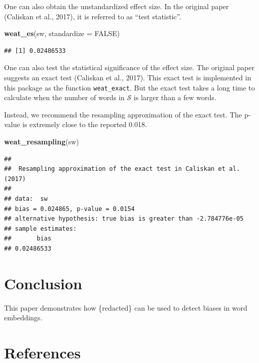 \documentclass[english,man,mask]{apa6}
\newenvironment{Shaded}{\begin{snugshade}}{\end{snugshade}}
\newcommand{\DataTypeTok}[1]{\textcolor[rgb]{0.13,0.29,0.53}{#1}}
\newcommand{\KeywordTok}[1]{\textcolor[rgb]{0.13,0.29,0.53}{\textbf{#1}}}
\newcommand{\NormalTok}[1]{#1}
\newcommand{\OtherTok}[1]{\textcolor[rgb]{0.56,0.35,0.01}{#1}}
\begin{document}
One can also obtain the unstandardized effect size. In the original paper (Caliskan et al., 2017), it is referred to as \enquote{test statistic}.

\begin{Shaded}
\begin{Highlighting}[]
\KeywordTok{weat_es}\NormalTok{(sw, }\DataTypeTok{standardize =} \OtherTok{FALSE}\NormalTok{)}
\end{Highlighting}
\end{Shaded}

\begin{verbatim}
## [1] 0.02486533
\end{verbatim}

One can also test the statistical significance of the effect size. The original paper suggests an exact test (Caliskan et al., 2017). This exact test is implemented in this package as the function \texttt{weat\_exact}. But the exact test takes a long time to calculate when the number of words in \(\mathcal{S}\) is larger than a few words.

Instead, we recommend the resampling approximation of the exact test. The p-value is extremely close to the reported 0.018.

\begin{Shaded}
\begin{Highlighting}[]
\KeywordTok{weat_resampling}\NormalTok{(sw)}
\end{Highlighting}
\end{Shaded}

\begin{verbatim}
## 
##  Resampling approximation of the exact test in Caliskan et al. (2017)
## 
## data:  sw
## bias = 0.024865, p-value = 0.0154
## alternative hypothesis: true bias is greater than -2.784776e-05
## sample estimates:
##       bias 
## 0.02486533
\end{verbatim}

\hypertarget{conclusion}{%
\section{Conclusion}\label{conclusion}}

This paper demonstrates how \{redacted\} can be used to detect biases in word embeddings.

\newpage

\hypertarget{references}{%
\section{References}\label{references}}
\end{document}
